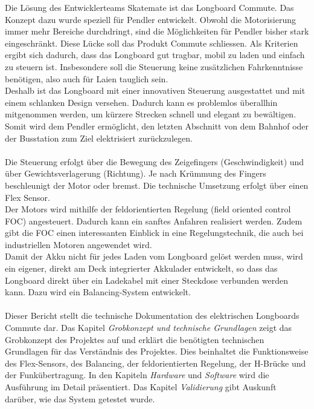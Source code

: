 Die Lösung des Entwicklerteams Skatemate ist das Longboard Commute. Das Konzept dazu wurde speziell für Pendler entwickelt. 
Obwohl die Motorisierung immer mehr Bereiche durchdringt, sind die Möglichkeiten für Pendler bisher stark eingeschränkt. Diese Lücke soll das Produkt Commute schliessen.
Als Kriterien ergibt sich dadurch, dass das Longboard gut tragbar, mobil zu laden und einfach zu steuern ist. Insbesondere soll die Steuerung keine zusätzlichen Fahrkenntnisse benötigen, also auch für Laien tauglich sein.\\
Deshalb ist das Longboard mit einer innovativen Steuerung ausgestattet und mit einem schlanken Design versehen. Dadurch kann es problemlos überallhin mitgenommen werden, um kürzere Strecken schnell und elegant zu bewältigen. Somit wird dem Pendler ermöglicht, den letzten Abschnitt von dem Bahnhof oder der Busstation zum Ziel elektrisiert zurückzulegen. 
\\ \\
Die Steuerung erfolgt über die Bewegung des Zeigefingers (Geschwindigkeit) und über Gewichtsverlagerung (Richtung). Je nach Krümmung des Fingers beschleunigt der Motor oder bremst. Die technische Umsetzung erfolgt über einen Flex Sensor. \\
Der Motors wird mithilfe der feldorientierten Regelung (field oriented control FOC) angesteuert. Dadurch kann ein sanftes Anfahren realisiert werden. Zudem gibt die FOC einen interessanten Einblick in eine Regelungstechnik, die auch bei industriellen Motoren angewendet wird. \\
Damit der Akku nicht für jedes Laden vom Longboard gelöst werden muss, wird ein eigener, direkt am Deck integrierter Akkulader entwickelt, so dass das Longboard direkt über ein Ladekabel mit einer Steckdose verbunden werden kann. Dazu wird ein Balancing-System entwickelt.
\\\\
Dieser Bericht stellt die technische Dokumentation des elektrischen Longboards Commute dar. Das Kapitel \textit{Grobkonzept und technische Grundlagen} zeigt das Grobkonzept des Projektes auf und erklärt die benötigten technischen Grundlagen für das Verständnis des Projektes. Dies beinhaltet die Funktionsweise des Flex-Sensors, des Balancing, der feldorientierten Regelung, der H-Brücke und der Funkübertragung. In den Kapiteln \textit{Hardware} und \textit{Software} wird die Ausführung im Detail präsentiert. Das Kapitel \textit{Validierung} gibt Auskunft darüber, wie das System getestet wurde. 
